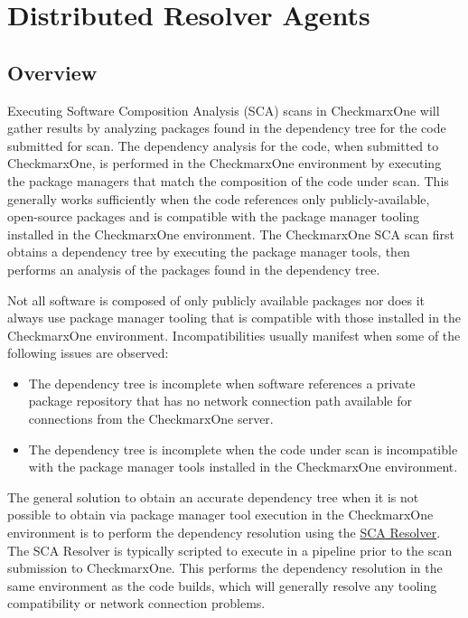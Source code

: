\chapter{Distributed Resolver Agents}\label{sec:resolver-agents}

\section{Overview}

Executing Software Composition Analysis (SCA) scans in CheckmarxOne will gather results
by analyzing packages found in the dependency tree for the code submitted for scan.  The
dependency analysis for the code, when submitted to CheckmarxOne, is performed
in the CheckmarxOne environment by executing the package managers that match the composition of the code
under scan.  This generally works sufficiently when the code references only publicly-available, open-source
packages and is compatible with the package manager tooling installed in the CheckmarxOne environment.  The
CheckmarxOne SCA scan first obtains a dependency tree by executing the package manager tools, then performs an analysis
of the packages found in the dependency tree.

Not all software is composed of only publicly available packages nor does it always use package manager tooling
that is compatible with those installed in the CheckmarxOne environment.  Incompatibilities usually manifest
when some of the following issues are observed:

\begin{itemize}
  \item The dependency tree is incomplete when software references a private package repository that has
  no network connection path available for connections from the CheckmarxOne server.
  \item The dependency tree is incomplete when the code under scan is incompatible with the 
  package manager tools installed in the CheckmarxOne environment.
\end{itemize}

The general solution to obtain an accurate dependency tree when it is not possible to obtain 
via package manager tool execution in the CheckmarxOne environment is to perform the dependency resolution using the 
\href{https://docs.checkmarx.com/en/34965-19197-checkmarx-sca-resolver-download-and-installation.html}{SCA Resolver}.
The SCA Resolver is typically scripted to execute in a pipeline prior to the scan submission to CheckmarxOne.  This performs the dependency resolution
in the same environment as the code builds, which will generally resolve any tooling compatibility or network connection
problems.  

